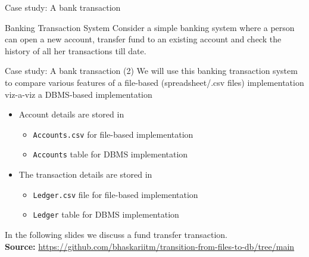 \documentclass[aspectratio=169, xcolor=dvipsnames]{beamer}
\begin{document}
\begin{frame}{Case study: A bank transaction}
    \begin{exampleblock}{Banking Transaction System}
        Consider a simple banking system where a person can open a new account, transfer fund to an existing account and check the history of all her transactions till date.
    \end{exampleblock}
    
\end{frame}

\begin{frame}{Case study: A bank transaction (2)}
    We will use this banking transaction system to compare various features of a file-based (spreadsheet/.csv files) implementation viz-a-viz a DBMS-based implementation
    
    \begin{itemize}[<+->]
        \item Account details are stored in
        \begin{itemize}
            \item \texttt{Accounts.csv} for file-based implementation
            \item \texttt{Accounts} table for DBMS implementation
        \end{itemize}
        \item The transaction details are stored in
        \begin{itemize}
            \item \texttt{Ledger.csv} file for file-based implementation
            \item \texttt{Ledger} table for DBMS implementation
        \end{itemize}
    \end{itemize}
    
    \vspace{1em}
    In the following slides we discuss a fund transfer transaction.\\
    \textbf{Source:} \url{https://github.com/bhaskariitm/transition-from-files-to-db/tree/main}
\end{frame}
\end{document}
